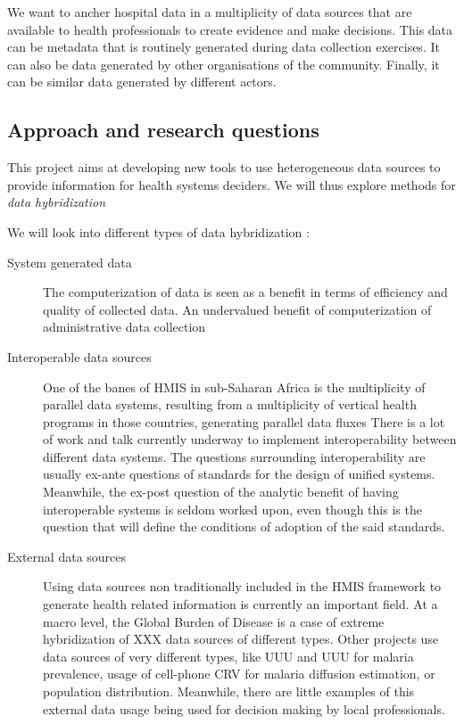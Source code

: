 We want to ancher hospital data in a multiplicity of data sources that are available to health professionals to create evidence and make decisions. This data can be metadata that is routinely generated during data collection exercises. It can also be data generated by other organisations of the community. Finally, it can be similar data generated by different actors.

\subsection{Approach and research questions}


This project aims at developing new tools to use heterogeneous data sources to provide information for health systems deciders. We will thus explore methods for \textit{data hybridization}

We will look into different types of data hybridization :
\begin{description}
	\item[System generated data] The computerization of data is seen as a benefit in terms of efficiency and quality of collected data. An undervalued benefit of computerization of administrative data collection

	\item[Interoperable data sources] One of the banes of HMIS in sub-Saharan Africa is the multiplicity of parallel data systems, resulting from a multiplicity of vertical health programs in those countries, generating parallel data fluxes%
	There is a lot of work and talk currently underway to implement interoperability between different data systems. The questions surrounding interoperability are usually ex-ante questions of standards for the design of unified systems. Meanwhile, the ex-post question of the analytic benefit of having interoperable systems is seldom worked upon, even though this is the question that will define the conditions of adoption of the said standards.

	\item[External data sources] Using data sources non traditionally included in the HMIS framework to generate health related information is currently an important field. At a macro level, the Global Burden of Disease is a case of extreme hybridization of XXX data sources of different types. %
	Other projects use data sources of very different types, like UUU and UUU for malaria prevalence, usage of cell-phone CRV for malaria diffusion estimation, or population distribution. %
	Meanwhile, there are little examples of this external data usage being used for decision making by local professionals.
\end{description}





